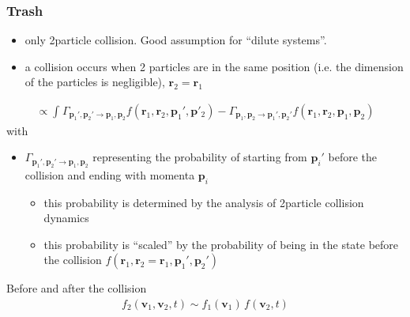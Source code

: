 \documentclass[letterpaper,10pt,english]{jupyterBook}
\begin{document}
\subsubsection*{Trash}
\begin{itemize}
\item {} 
\sphinxAtStartPar
only 2\sphinxhyphen{}particle collision. Good assumption for “dilute systems”.

\item {} 
\sphinxAtStartPar
a collision occurs when 2 particles are in the same position (i.e. the dimension of the particles is negligible), \(\mathbf{r}_2 = \mathbf{r}_1\)

\end{itemize}
\begin{equation*}
\begin{split}\propto \int_{} \Gamma_{\mathbf{p}_1',\mathbf{p}_2' \rightarrow \mathbf{p}_1, \mathbf{p}_2} f(\mathbf{r}_1, \mathbf{r}_2, \mathbf{p}_1', \mathbf{p}'_2) - \Gamma_{\mathbf{p}_1 ,\mathbf{p}_2  \rightarrow \mathbf{p}_1', \mathbf{p}_2'} f(\mathbf{r}_1, \mathbf{r}_2, \mathbf{p}_1, \mathbf{p}_2)\end{split}
\end{equation*}
\sphinxAtStartPar
with
\begin{itemize}
\item {} 
\sphinxAtStartPar
\(\Gamma_{\mathbf{p}_1', \mathbf{p}_2' \rightarrow \mathbf{p}_1, \mathbf{p}_2}\) representing the probability of starting from \(\mathbf{p}_i'\) before the collision and ending with momenta \(\mathbf{p}_i\)
\begin{itemize}
\item {} 
\sphinxAtStartPar
this probability is determined by the analysis of 2\sphinxhyphen{}particle collision dynamics

\item {} 
\sphinxAtStartPar
this probability is “scaled” by the probability of being in the state before the collision \(f(\mathbf{r}_1, \mathbf{r}_2 = \mathbf{r}_1, \mathbf{p}_1', \mathbf{p}_2')\)

\end{itemize}

\end{itemize}

\sphinxAtStartPar
{} Before and after the collision
\begin{equation*}
\begin{split}f_2(\mathbf{v}_1, \mathbf{v}_2, t) \sim f_1(\mathbf{v}_1) \, f(\mathbf{v}_2,t)\end{split}
\end{equation*}
\end{document}
